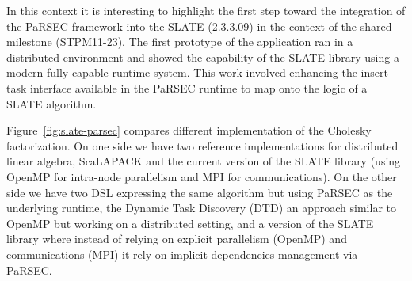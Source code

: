In this context it is interesting to highlight the first step toward
the integration of the PaRSEC framework into the SLATE (2.3.3.09) in
the context of the shared milestone (STPM11-23). The first prototype
of the application ran in a distributed environment and showed the
capability of the SLATE library using a modern fully capable runtime
system. This work involved enhancing the insert task interface
available in the PaRSEC runtime to map onto the logic of a SLATE
algorithm.

Figure~\ref{fig:slate-parsec} compares different implementation of the
Cholesky factorization. On one side we have two reference
implementations for distributed linear algebra, ScaLAPACK and the
current version of the SLATE library (using OpenMP for intra-node
parallelism and MPI for communications). On the other side we have two
DSL expressing the same algorithm but using PaRSEC as the underlying
runtime, the Dynamic Task Discovery (DTD) an approach similar to
OpenMP but working on a distributed setting, and a version of the
SLATE library where instead of relying on explicit parallelism
(OpenMP) and communications (MPI) it rely on implicit dependencies
management via PaRSEC.



%
%


